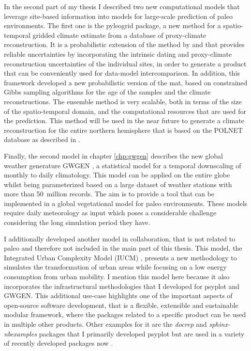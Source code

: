 \begin{refsection}
In the second part of my thesis I described two new computational models that leverage site-based information into models for large-scale prediction of paleo environments. The first one is the pyleogrid package, a new method for a spatio-temporal gridded climate estimate from a database of proxy-climate reconstruction. It is a probabilistic extension of the method by \cite{MauriDavisCollinsEtAl2015} and \cite{DavisBrewerStevensonEtAl2003} that provides reliable uncertainties by incorporating the intrinsic dating and proxy-climate reconstruction uncertainties of the individual sites, in order to generate a product that can be conveniently used for data-model intercomparison. In addition, this framework developed a new probabilistic version of the \gls{mat}, based on constrained Gibbs sampling algorithms for the age of the samples and the climate reconstructions. The ensemble method is very scalable, both in terms of the size of the spatio-temporal domain, and the computational resources that are used for the prediction. This method will be used in the near future to generate a climate reconstruction for the entire northern hemisphere that is based on the POLNET database as described in \cite{DavisKaplan2017}.

Finally, the second model in chapter \ref{chp:gwgen} describes the new global weather generature GWGEN \citep{SommerKaplan2017b}, a statistical model for a temporal downscaling of monthly to daily climatology. This model can be applied on the entire globe whilst being parameterized based on a large dataset of weather stations with more than 50~million records. The aim is to provide a tool that can be implemented in a global vegetational model for paleo environments. These models require daily meteorology as input which poses a considerable challenge considering the long simulation period they have.

I additionally developed another model in collaboration, that is not related to paleo and therefore not included in the main part of this thesis. This model, the Integrated Urban Complexity Model (IUCM) \citep{CremadesSommer2019}, presents a new methodology to simulates the transformation of urban areas while focusing on a low energy consumption from urban mobility. I mention this model here because it also incorporates the infrastructural methodologies that I developed for psyplot and GWGEN. This additional use-case highlights one of the important aspects of open-source software development, that is a flexible, extensible and sustainable modular framework, where the packages related to a specific product can be used in multiple other products. Other examples for it are the \textit{docrep} and \textit{sphinx-nbexamples} packages \citep[see also appendix \ref{chp:software}]{Sommer2018a, Sommer2018c} that I primarily developed psyplot but are used in a variety of recently developed packages now \citep[e.g.][]{AbernatheyUchidaBuseckeEtAl2017, BanihirweLongAltuntasEtAl2019, Uchida2018}.

\printbibliography[heading=subbibintoc]

\end{refsection}